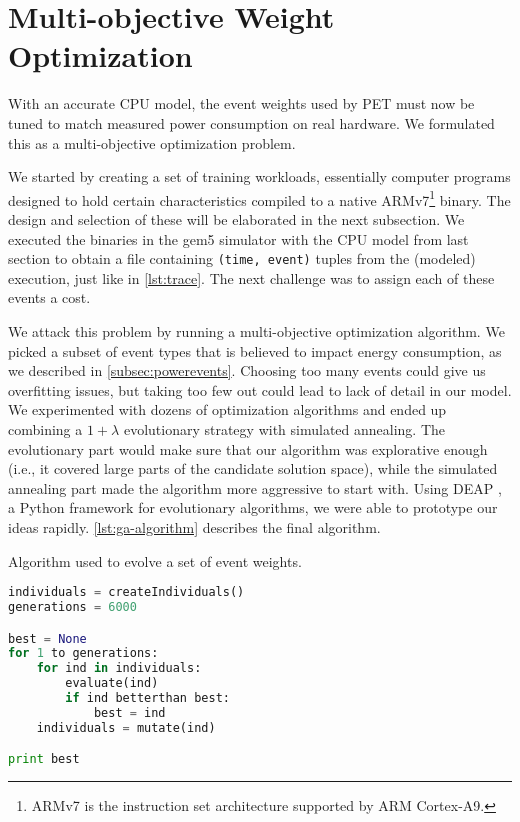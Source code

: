 \section{Multi-objective Weight Optimization}
\label{sec:multiobjective}

With an accurate CPU model, the event weights used by PET must now be tuned to
match measured power consumption on real hardware. We formulated this as a
multi-objective optimization problem.

We started by creating a set of training workloads, essentially computer
programs designed to hold certain characteristics compiled to a native
ARMv7\footnote{ARMv7 is the instruction set architecture supported by ARM
Cortex-A9.} binary. The design and selection of these will be elaborated in the
next subsection. We executed the binaries in the gem5 simulator with the CPU
model from last section to obtain a file containing \texttt{(time, event)}
tuples from the (modeled) execution, just like in \autoref{lst:trace}. The next
challenge was to assign each of these events a cost.

We attack this problem by running a multi-objective optimization algorithm. We
picked a subset of event types that is believed to impact energy consumption, as
we described in \autoref{subsec:powerevents}. Choosing too many events could
give us overfitting issues, but taking too few out could lead to lack of detail
in our model. We experimented with dozens of optimization algorithms and ended
up combining a $1 + \lambda$ evolutionary strategy with simulated annealing. The
evolutionary part would make sure that our algorithm was explorative enough
(i.e., it covered large parts of the candidate solution space), while the
simulated annealing part made the algorithm more aggressive to start with. Using
DEAP \cite{DEAP_JMLR2012}, a Python framework for evolutionary algorithms, we
were able to prototype our ideas rapidly. \autoref{lst:ga-algorithm} describes
the final algorithm.

\begin{algorithm}[tb]
\caption{Algorithm used to evolve a set of event weights.}
\label{lst:ga-algorithm}
\begin{lstlisting}[language=python,style=algo]
individuals = createIndividuals()
generations = 6000

best = None
for 1 to generations:
    for ind in individuals:
        evaluate(ind)
        if ind betterthan best:
            best = ind
    individuals = mutate(ind)

print best
\end{lstlisting}
\end{algorithm}

